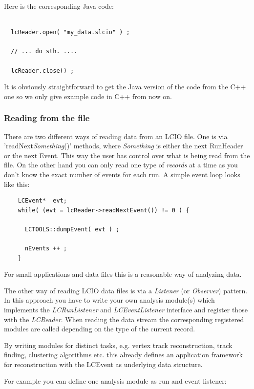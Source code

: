 \documentclass[twoside]{article}
\begin{document}
Here is the corresponding Java code:
\begin{verbatim}

  lcReader.open( "my_data.slcio" ) ;

  // ... do sth. ....

  lcReader.close() ;

\end{verbatim}
It is obviously straightforward to get the Java version of the code from the C++ one
so we only give example code in C++ from now on.

\subsubsection{Reading from the file}
There are two different ways of reading data from an LCIO file. One is via 
'readNext{\em Something}()' methods, where {\em Something} is either the next RunHeader or the next 
Event. This way the user has control over what is being read from the file. On the other hand you 
can only read one type of {\em records } at a time as you don't know the exact number of events for 
each run. A simple event loop looks like this: 

\begin{verbatim}
    LCEvent*  evt;
    while( (evt = lcReader->readNextEvent()) != 0 ) {
      
      LCTOOLS::dumpEvent( evt ) ;
      
      nEvents ++ ;
    }
\end{verbatim}

For small applications and data files this is a reasonable way of analyzing data.

The other way of reading LCIO data files is via a {\em Listener} (or {\em Observer}) pattern.
In this approach you have to write your own analysis module(s) which implements the 
{\em LCRunListener} and {\em LCEventListener} interface and register those with the {\em LCReader}.
When reading the data stream the corresponding registered modules are called depending on the type 
of the current record. 

By writing modules for distinct tasks, e.g. vertex track reconstruction, 
track finding, clustering algorithms etc. this already defines an application framework for 
reconstruction with the LCEvent as underlying data structure.

For example you can define one analysis module as run and event listener:
\end{document}
